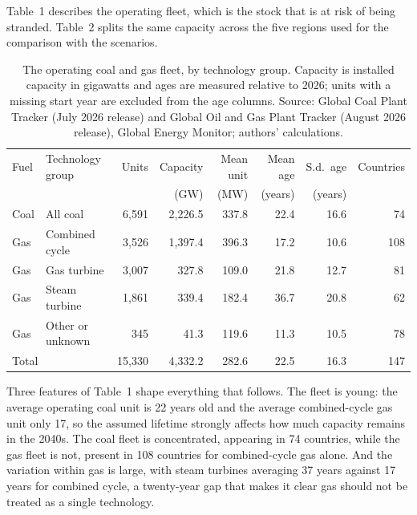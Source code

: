 \documentclass[11pt,a4paper]{article}
\begin{document}
Table~1 describes the operating fleet, which is the stock that is at risk of being stranded. Table~2 splits the same capacity across the five regions used for the comparison with the scenarios.

\begin{table}[htbp]
\centering
\caption{The operating coal and gas fleet, by technology group. Capacity is installed capacity in gigawatts and ages are measured relative to 2026; units with a missing start year are excluded from the age columns. Source: Global Coal Plant Tracker (July 2026 release) and Global Oil and Gas Plant Tracker (August 2026 release), Global Energy Monitor; authors' calculations.}
\label{tab:fleet}
\small
\begin{tabular}{llrrrrrr}
\toprule
Fuel & Technology group & Units & Capacity & Mean unit & Mean age & S.d.\ age & Countries \\
 & & & (GW) & (MW) & (years) & (years) & \\
\midrule
Coal & All coal            & 6{,}591 & 2{,}226.5 & 337.8 & 22.4 & 16.6 & 74 \\
\addlinespace
Gas  & Combined cycle      & 3{,}526 & 1{,}397.4 & 396.3 & 17.2 & 10.6 & 108 \\
Gas  & Gas turbine         & 3{,}007 &   327.8 & 109.0 & 21.8 & 12.7 & 81 \\
Gas  & Steam turbine       & 1{,}861 &   339.4 & 182.4 & 36.7 & 20.8 & 62 \\
Gas  & Other or unknown    &   345 &    41.3 & 119.6 & 11.3 & 10.5 & 78 \\
\midrule
\multicolumn{2}{l}{Total} & 15{,}330 & 4{,}332.2 & 282.6 & 22.5 & 16.3 & 147 \\
\bottomrule
\end{tabular}
\end{table}

Three features of Table~1 shape everything that follows. The fleet is young: the average operating coal unit is 22 years old and the average combined-cycle gas unit only 17, so the assumed lifetime strongly affects how much capacity remains in the 2040s. The coal fleet is concentrated, appearing in 74 countries, while the gas fleet is not, present in 108 countries for combined-cycle gas alone. And the variation within gas is large, with steam turbines averaging 37 years against 17 years for combined cycle, a twenty-year gap that makes it clear gas should not be treated as a single technology.
\end{document}
